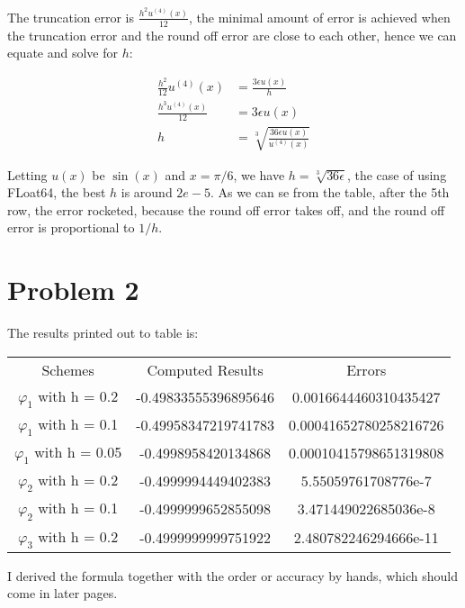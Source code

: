 \documentclass[]{article}
\begin{document}
The truncation error is $\frac{h^2u^{(4)}(x)}{12}$, the minimal amount of error is achieved when the truncation error and the round off error are close to each other, hence we can equate and solve for $h$: 

\begin{align*}\tag{1.2}\label{eqn:1.2}
    \frac{h^2}{12}u^{(4)}(x) &= \frac{3\epsilon u(x)}{h}
    \\
    \frac{h^3u^{(4)}(x)}{12} &= 3 \epsilon u(x)
    \\
    h &= 
    \sqrt[3]{\frac{
        36 \epsilon u(x)
    }{u^{(4)}(x)}}
\end{align*}

Letting $u(x)$ be $\sin(x)$ and $x = \pi/6$, we have $h = \sqrt[3]{36\epsilon}$, the case of using FLoat64, the best $h$ is around $2e-5$. As we can se from the table, after the 5th row, the error rocketed, because the round off error takes off, and the round off error is proportional to $1/h$. 
    
\newpage
\section*{Problem 2}

The results printed out to table is: \\

\begin{center}
    \begin{tabular}{ccc}
        Schemes & Computed Results & Errors\\
        $\varphi_1$ with h = 0.2 & -0.49833555396895646 & 0.0016644460310435427\\
        $\varphi_1$ with h = 0.1 & -0.49958347219741783 & 0.00041652780258216726\\
        $\varphi_1$ with h = 0.05 & -0.4998958420134868 & 0.00010415798651319808\\
        $\varphi_2$ with h = 0.2 & -0.4999994449402383 & 5.55059761708776e-7\\
        $\varphi_2$ with h = 0.1 & -0.4999999652855098 & 3.471449022685036e-8\\
        $\varphi_3$ with h = 0.2 & -0.4999999999751922 & 2.480782246294666e-11\\
    \end{tabular}    
\end{center}

I derived the formula together with the order or accuracy by hands, which should come in later pages. 
\newpage
\end{document}
